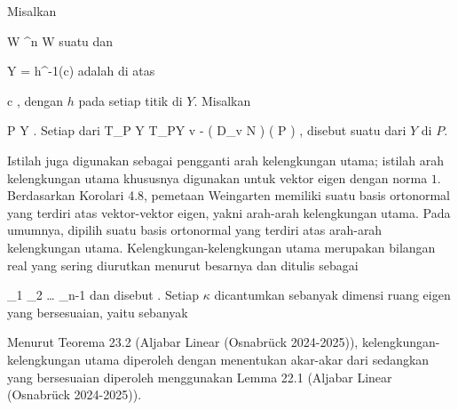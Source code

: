 {}
{

Misalkan

\mavergleichskette
{\vergleichskette
{ W
}
{ \subseteq }{ \R^n
}
{  }{
}
{    }{
}
{   }{
}
}
{}{}{}
 { W } { \R
} {}
suatu
dan

\mavergleichskette
{\vergleichskette
{ Y
}
{ = }{ h^{-1}(c)
}
{  }{
}
{    }{
}
{   }{
}
}
{}{}{}
adalah
di atas

\mavergleichskette
{\vergleichskette
{ c
}
{ \in }{ \R
}
{  }{
}
{    }{
}
{   }{
}
}
{}{}{,}
dengan $h$
pada setiap titik di $Y$. Misalkan

\mavergleichskette
{\vergleichskette
{ P
}
{ \in }{ Y
}
{  }{
}
{    }{
}
{   }{
}
}
{}{}{.}
Setiap
dari
 {T_P Y} { T_PY
} { v } { - \left(  D_{v}  N   \right) \left(   P  \right)
} {,}
disebut suatu
dari $Y$ di $P$.

}

Istilah  {} juga digunakan sebagai pengganti arah kelengkungan utama; istilah arah kelengkungan utama khususnya digunakan untuk vektor eigen dengan norma $1$. Berdasarkan
Korolari 4.8,
pemetaan Weingarten memiliki suatu basis ortonormal yang terdiri atas vektor-vektor eigen, yakni arah-arah kelengkungan utama. Pada umumnya, dipilih suatu basis ortonormal yang terdiri atas arah-arah kelengkungan utama. Kelengkungan-kelengkungan utama merupakan bilangan real yang sering diurutkan menurut besarnya dan ditulis sebagai

\mavergleichskettedisp
{\vergleichskette
{ \kappa_1
}
{ \leq} { \kappa_2
}
{ \leq   \ldots \leq} { \kappa_{n-1}
}
{ } {
}
{ } {
}
}
{}{}{}
dan disebut  {.} Setiap $\kappa$ dicantumkan sebanyak dimensi ruang eigen yang bersesuaian, yaitu sebanyak

Menurut
Teorema 23.2 (Aljabar Linear (Osnabrück 2024-2025)),
kelengkungan-kelengkungan utama diperoleh dengan menentukan akar-akar
dari
sedangkan
yang bersesuaian diperoleh menggunakan
Lemma 22.1 (Aljabar Linear (Osnabrück 2024-2025)).

